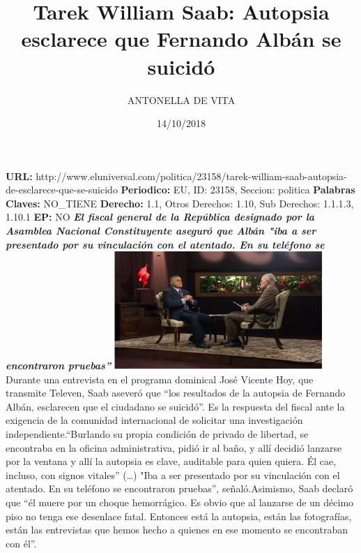 \documentclass{article}%
\title{\textbf{Tarek William Saab: Autopsia esclarece que Fernando Albán se suicidó}}%
\author{ANTONELLA DE VITA}%
\date{14/10/2018}%
\begin{document}
%
\normalsize%
\maketitle%
\textbf{URL: }%
http://www.eluniversal.com/politica/23158/tarek{-}william{-}saab{-}autopsia{-}de{-}esclarece{-}que{-}se{-}suicido\newline%
%
\textbf{Periodico: }%
EU, %
ID: %
23158, %
Seccion: %
politica\newline%
%
\textbf{Palabras Claves: }%
NO\_TIENE\newline%
%
\textbf{Derecho: }%
1.1, %
Otros Derechos: %
1.10, %
Sub Derechos: %
1.1.1.3, 1.10.1\newline%
%
\textbf{EP: }%
NO\newline%
\newline%
%
\textbf{\textit{El fiscal general de la República designado por la Asamblea Nacional Constituyente aseguró que Albán "iba a ser presentado por su vinculación con el atentado. En su teléfono se encontraron pruebas”}}%
\newline%
\newline%
%
\includegraphics[width=300px]{153.jpg}%
\newline%
%
Durante una entrevista en el programa dominical José Vicente Hoy, que transmite Televen, Saab aseveró que “los resultados de la autopsia de Fernando Albán, esclarecen que el ciudadano se suicidó”. Es la respuesta del fiscal ante la exigencia de la comunidad internacional de solicitar una investigación independiente.“Burlando su propia condición de privado de libertad, se encontraba en la oficina administrativa, pidió ir al baño, y allí decidió lanzarse por la ventana y allí la autopsia es clave, auditable para quien  quiera. Él cae, incluso, con signos vitales” (…) "Iba a ser presentado por su vinculación con el atentado. En su teléfono se encontraron pruebas”, señaló.Asimismo, Saab declaró que “él muere por un choque hemorrágico. Es obvio que al lanzarse de un décimo piso no tenga ese desenlace fatal. Entonces está la autopsia, están las fotografías, están las entrevistas que hemos hecho a quienes en ese momento se encontraban con él”.%
\newline%
%
\end{document}
